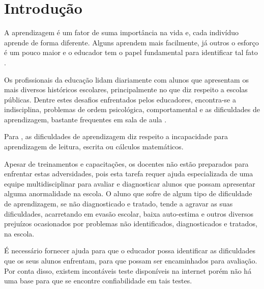 \documentclass[
	12pt,				%
    oneside,			%
	a4paper,			%
	english,			%
	french,				%
	spanish,			%
	brazil,				%
	]{abntex2}
\begin{document}
\tableofcontents*


\textual


\chapter{Introdução} %
A aprendizagem é um fator de suma importância na vida e, cada indivíduo aprende de forma diferente. Alguns aprendem mais facilmente, já outros o esforço é um pouco maior e o educador tem o papel fundamental para identificar tal fato \cite{Spinello}.

Os profissionais da educação lidam diariamente com alunos que apresentam os mais diversos históricos escolares, principalmente no que diz respeito a escolas públicas. Dentre estes desafios enfrentados pelos educadores, encontra-se a indisciplina, problemas de ordem psicológica, comportamental e as dificuldades de aprendizagem, bastante frequentes em sala de aula \cite{Spinello}.

Para , as dificuldades de aprendizagem diz respeito a incapacidade para aprendizagem de leitura, escrita ou cálculos matemáticos.

Apesar de treinamentos e capacitações, os docentes não estão preparados para enfrentar estas adversidades, pois esta tarefa requer ajuda especializada de uma equipe multidisciplinar para avaliar e diagnosticar alunos que possam apresentar alguma anormalidade na escola. O aluno que sofre de algum tipo de dificuldade de aprendizagem, se não diagnosticado e tratado, tende a agravar as suas dificuldades, acarretando em evasão escolar, baixa auto-estima e outros diversos prejuízos ocasionados por problemas não identificados, diagnosticados e tratados, na escola.

É necessário fornecer ajuda para que o educador possa identificar as dificuldades que os seus alunos enfrentam, para que possam ser encaminhados para avaliação. Por conta disso, existem incontáveis teste disponíveis na internet porém não há uma base para que se encontre confiabilidade em tais testes.
\end{document}
